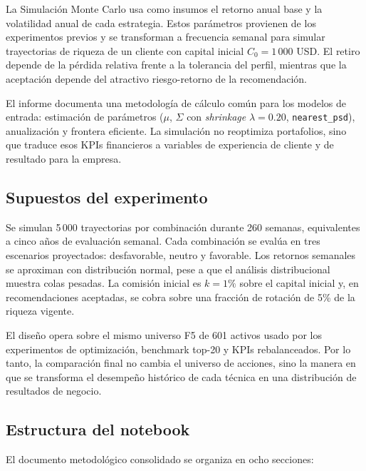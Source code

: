 La Simulaci\'on Monte Carlo usa como insumos el retorno anual base y la
volatilidad anual de cada estrategia. Estos par\'ametros provienen de los
experimentos previos y se transforman a frecuencia semanal para simular
trayectorias de riqueza de un cliente con capital inicial $C_0 = 1\,000$ USD. El
retiro depende de la p\'erdida relativa frente a la tolerancia del perfil,
mientras que la aceptaci\'on depende del atractivo riesgo-retorno de la
recomendaci\'on.

El informe documenta una metodolog\'ia de c\'alculo com\'un para los modelos de
entrada: estimaci\'on de par\'ametros ($\mu$, $\Sigma$ con \textit{shrinkage}
$\lambda = 0.20$, \texttt{nearest\_psd}), anualizaci\'on y frontera eficiente.
La simulaci\'on no reoptimiza portafolios, sino que traduce esos KPIs financieros
a variables de experiencia de cliente y de resultado para la empresa.

\subsection*{Supuestos del experimento}

Se simulan 5\,000 trayectorias por combinaci\'on durante 260 semanas, equivalentes
a cinco a\~nos de evaluaci\'on semanal. Cada combinaci\'on se eval\'ua en tres
escenarios proyectados: desfavorable, neutro y favorable. Los retornos semanales
se aproximan con distribuci\'on normal, pese a que el an\'alisis distribucional
muestra colas pesadas. La comisi\'on inicial es $k = 1\%$ sobre el capital
inicial y, en recomendaciones aceptadas, se cobra sobre una fracci\'on de
rotaci\'on de 5\% de la riqueza vigente.

El dise\~no opera sobre el mismo universo F5 de 601 activos usado por los
experimentos de optimizaci\'on, benchmark top-20 y KPIs rebalanceados. Por lo
tanto, la comparaci\'on final no cambia el universo de acciones, sino la manera
en que se transforma el desempe\~no hist\'orico de cada t\'ecnica en una
distribuci\'on de resultados de negocio.

\subsection*{Estructura del notebook}

El documento metodol\'ogico consolidado se organiza en ocho secciones:

